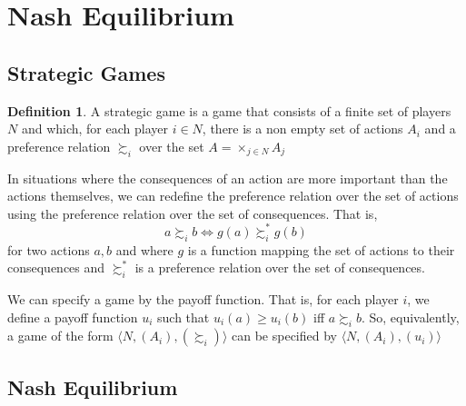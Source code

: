 \documentclass{tufte-handout}
\theoremstyle{definition}
\newtheorem{defn}[thm]{Definition}
\theoremstyle{remark}
\begin{document}
\section{Nash Equilibrium}
\subsection{Strategic Games}
\begin{defn}
    A strategic game is a game that consists of a finite set of players $N$ and which, for each player $i\in N$, there is a non empty set of actions $A_i$ and a preference relation $\succsim_i$ over the set $A=\times_{j\in N}A_j$
\end{defn}
In situations where the consequences of an action are more important than the actions themselves, we can redefine the preference relation over the set of actions using the preference relation over the set of consequences. That is, 
$$
a \succsim_i b \iff g(a)\succsim^*_i g(b)
$$
for two actions $a,b$ and where $g$ is a function mapping the set of actions to their consequences and $\succsim^*_i$ is a preference relation over the set of consequences.

We can specify a game by the payoff function. That is, for each player $i$, we define a payoff function $u_i$ such that $u_i(a)\geq u_i(b)$ iff $a\succsim_i b$. So, equivalently, a game of the form $\langle N, (A_i),(\succsim_i) \rangle$ can be specified by $\langle N, (A_i),(u_i) \rangle$

\subsection{Nash Equilibrium}
\end{document}
